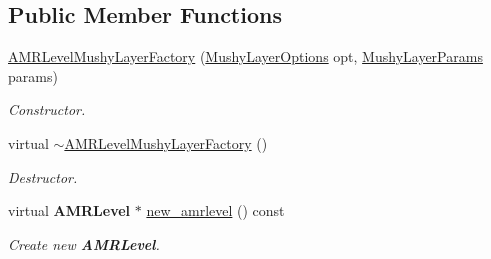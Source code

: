 \subsection*{Public Member Functions}
\begin{DoxyCompactItemize}
\item 
\mbox{\label{class_a_m_r_level_mushy_layer_factory_a6bc47d04d4211086b84222056fb51139}} 
\hyperlink{class_a_m_r_level_mushy_layer_factory_a6bc47d04d4211086b84222056fb51139}{A\+M\+R\+Level\+Mushy\+Layer\+Factory} (\hyperlink{struct_mushy_layer_options}{Mushy\+Layer\+Options} opt, \hyperlink{class_mushy_layer_params}{Mushy\+Layer\+Params} params)
\begin{DoxyCompactList}\small\item\em Constructor. \end{DoxyCompactList}\item 
\mbox{\label{class_a_m_r_level_mushy_layer_factory_af574fd628470ed342ad0687f055924f1}} 
virtual \hyperlink{class_a_m_r_level_mushy_layer_factory_af574fd628470ed342ad0687f055924f1}{$\sim$\+A\+M\+R\+Level\+Mushy\+Layer\+Factory} ()
\begin{DoxyCompactList}\small\item\em Destructor. \end{DoxyCompactList}\item 
\mbox{\label{class_a_m_r_level_mushy_layer_factory_a4c7eca95a2721499cf8ee4b1e7c44e27}} 
virtual \textbf{ A\+M\+R\+Level} $\ast$ \hyperlink{class_a_m_r_level_mushy_layer_factory_a4c7eca95a2721499cf8ee4b1e7c44e27}{new\+\_\+amrlevel} () const
\begin{DoxyCompactList}\small\item\em Create new \textbf{ A\+M\+R\+Level}. \end{DoxyCompactList}\end{DoxyCompactItemize}
